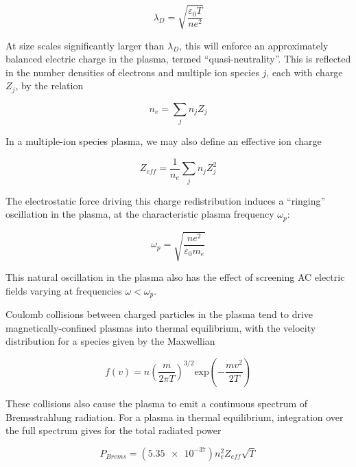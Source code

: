 \begin{equation}\label{eq:debye}
 \lambda_D = \sqrt{ \frac{\varepsilon_0 T}{n e^2} }
\end{equation}

\noindent At size scales significantly larger than $\lambda_D$, this will enforce an approximately balanced electric charge in the plasma, termed ``quasi-neutrality''.  This is reflected in the number densities of electrons and multiple ion species $j$, each with charge $Z_j$, by the relation

\begin{equation}\label{eq:quasineutral}
 n_e = \sum_j{n_j Z_j}
\end{equation}

\noindent In a multiple-ion species plasma, we may also define an effective ion charge

\begin{equation}\label{eq:Zeff}
 Z_{eff} = \frac{1}{n_e} \sum_j{n_j Z_j^2}
\end{equation}

The electrostatic force driving this charge redistribution induces a ``ringing'' oscillation in the plasma, at the characteristic plasma frequency $\omega_p$:

\begin{equation}\label{eq:omegap}
 \omega_p = \sqrt{ \frac{ne^2}{\varepsilon_0 m_e} }
\end{equation}

\noindent This natural oscillation in the plasma also has the effect of screening AC electric fields varying at frequencies $\omega < \omega_p$.

Coulomb collisions between charged particles in the plasma tend to drive magnetically-confined plasmas into thermal equilibrium, with the velocity distribution for a species given by the Maxwellian

\begin{equation}\label{eq:maxwell}
 f(v) = n \left( \frac{m}{2\pi T} \right)^{3/2} \mbox{exp}\left(-\frac{mv^2}{2T} \right)
\end{equation}

\noindent These collisions also cause the plasma to emit a continuous spectrum of Bremsstrahlung radiation.  For a plasma in thermal equilibrium, integration over the full spectrum gives for the total radiated power

\begin{equation}\label{eq:brems}
 P_{Brems} = \left( \num{5.35e-37} \right) n_e^2 Z_{eff} \sqrt{T}
\end{equation}

